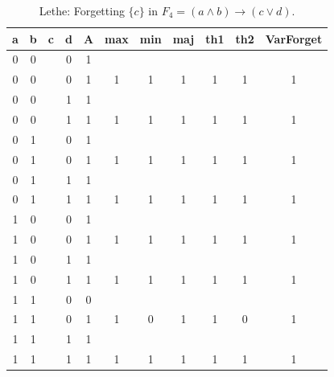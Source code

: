 \begin{table}[!tb]
    \centering
    \begin{tabular}{|c|c|c|c|c|c|c|c|c|c|c|}
        \hline
        \textbf{a} & \textbf{b} & \textbf{c} & \textbf{d} & \textbf{A} & \textbf{max} & \textbf{min} & \textbf{maj} & \textbf{th1} & \textbf{th2} & \textbf{VarForget} \\ \hline
        \rowcolor{gray!40} 0 & 0 &  & 0 & 1 &  &  &  &  &  &  \\ \hline
        \rowcolor{gray!40} 0 & 0 &  & 0 & 1 & 1 & 1 & 1 & 1 & 1 & 1 \\ \hline
        \rowcolor{blue!40} 0 & 0 &  & 1 & 1 &  &  &  &  &  &  \\ \hline
        \rowcolor{blue!40} 0 & 0 &  & 1 & 1 & 1 & 1 & 1 & 1 & 1 & 1 \\ \hline
        \rowcolor{red!40} 0 & 1 &  & 0 & 1 &  &  &  &  &  &  \\ \hline
        \rowcolor{red!40} 0 & 1 &  & 0 & 1 & 1 & 1 & 1 & 1 & 1 & 1 \\ \hline
        \rowcolor{green!40} 0 & 1 &  & 1 & 1 &  &  &  &  &  &  \\ \hline
        \rowcolor{green!40} 0 & 1 &  & 1 & 1 & 1 & 1 & 1 & 1 & 1 & 1 \\ \hline
        \rowcolor{yellow!40} 1 & 0 &  & 0 & 1 &  &  &  &  &  &  \\ \hline
        \rowcolor{yellow!40} 1 & 0 &  & 0 & 1 & 1 & 1 & 1 & 1 & 1 & 1 \\ \hline
        \rowcolor{gray!40} 1 & 0 &  & 1 & 1 &  &  &  &  &  &  \\ \hline
        \rowcolor{gray!40} 1 & 0 &  & 1 & 1 & 1 & 1 & 1 & 1 & 1 & 1 \\ \hline
        \rowcolor{blue!40} 1 & 1 &  & 0 & 0 &  &  &  &  &  &  \\ \hline
        \rowcolor{blue!40} 1 & 1 &  & 0 & 1 & 1 & 0 & 1 & 1 & 0 & 1 \\ \hline
        \rowcolor{red!40} 1 & 1 &  & 1 & 1 &  &  &  &  &  &  \\ \hline
        \rowcolor{red!40} 1 & 1 &  & 1 & 1 & 1 & 1 & 1 & 1 & 1 & 1 \\ \hline
    \end{tabular}
    \caption{Lethe: Forgetting $\{c\}$ in $F_{4} = (a \land b) \rightarrow (c \lor d)$.}
    \label{tab:lethe-F4-c}
\end{table}
